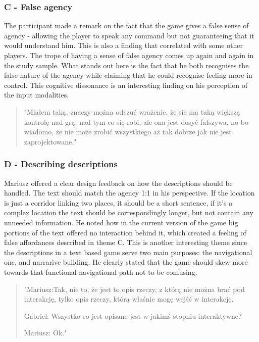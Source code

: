 \subsubsection{C - False agency}

The participant made a remark on the fact that the game gives a false sense of agency - allowing the player to speak any command but not guaranteeing that it would understand him. 
This is also a finding that correlated with some other players. The trope of having a sense of false agency comes up again and again in the study sample. What stands out here is the fact that he both recognises the false nature of the agency while claiming that he could recognise feeling more in control. This cognitive dissonance is an interesting finding on his perception of the input modalities. 

\begin{quote}
    "Miałem taką, znaczy można odczuć wrażenie, że się ma taką większą kontrolę nad grą, nad tym co się robi, ale ona jest dosyć fałszywa, no bo wiadomo, że nie może zrobić wszystkiego aż tak dobrze jak nie jest zaprojektowane."
\end{quote}


\subsubsection{D - Describing descriptions}

Mariusz offered a clear design feedback on how the descriptions should be handled. The text should match the agency 1:1 in his perspective. If the location is just a corridor linking two places, it should be a short sentence, if it's a complex location the text should be correspondingly longer, but not contain any unneeded information. He noted how in the current version of the game big portions of the text offered no interaction behind it, which created a feeling of false affordances described in theme C. This is another interesting theme since the descriptions in a text based game serve two main purposes: the navigational one, and narrarive building. He clearly stated that the game should skew more towards that functional-navigational path not to be confusing. 

\begin{quote}
    "Mariusz:Tak, nie to, że jest to opis rzeczy, z którą nie można brać pod interakcję, tylko opis rzeczy, którą właśnie mogę wejść w interakcję.

    Gabriel: Wszystko co jest opisane jest w jakimś stopniu interaktywne?

    Mariusz: Ok."
\end{quote}





